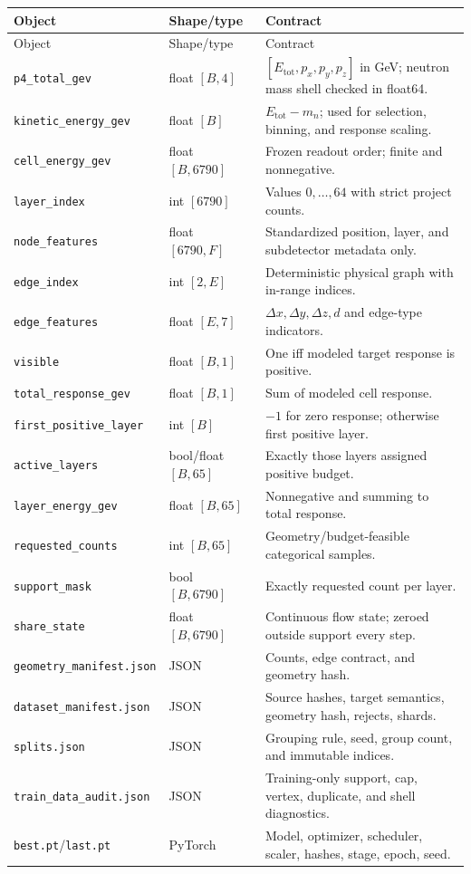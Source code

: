 \documentclass[10pt,a4paper]{article}
\newcommand{\Etot}{E_{\mathrm{tot}}}
\begin{document}
\begin{longtable}{@{}p{}p{}p{}@{}}
\toprule
Object & Shape/type & Contract \\
\midrule
\endfirsthead
\toprule
Object & Shape/type & Contract \\
\midrule
\endhead
\texttt{p4\_total\_gev} & float $[B,4]$ & $[\Etot,p_x,p_y,p_z]$ in GeV; neutron mass shell checked in float64. \\
\texttt{kinetic\_energy\_gev} & float $[B]$ & $\Etot-m_n$; used for selection, binning, and response scaling. \\
\texttt{cell\_energy\_gev} & float $[B,6790]$ & Frozen readout order; finite and nonnegative. \\
\texttt{layer\_index} & int $[6790]$ & Values $0,\ldots,64$ with strict project counts. \\
\texttt{node\_features} & float $[6790,F]$ & Standardized position, layer, and subdetector metadata only. \\
\texttt{edge\_index} & int $[2,E]$ & Deterministic physical graph with in-range indices. \\
\texttt{edge\_features} & float $[E,7]$ & $\Delta x,\Delta y,\Delta z,d$ and edge-type indicators. \\
\texttt{visible} & float $[B,1]$ & One iff modeled target response is positive. \\
\texttt{total\_response\_gev} & float $[B,1]$ & Sum of modeled cell response. \\
\texttt{first\_positive\_layer} & int $[B]$ & $-1$ for zero response; otherwise first positive layer. \\
\texttt{active\_layers} & bool/float $[B,65]$ & Exactly those layers assigned positive budget. \\
\texttt{layer\_energy\_gev} & float $[B,65]$ & Nonnegative and summing to total response. \\
\texttt{requested\_counts} & int $[B,65]$ & Geometry/budget-feasible categorical samples. \\
\texttt{support\_mask} & bool $[B,6790]$ & Exactly requested count per layer. \\
\texttt{share\_state} & float $[B,6790]$ & Continuous flow state; zeroed outside support every step. \\
\texttt{geometry\_manifest.json} & JSON & Counts, edge contract, and geometry hash. \\
\texttt{dataset\_manifest.json} & JSON & Source hashes, target semantics, geometry hash, rejects, shards. \\
\texttt{splits.json} & JSON & Grouping rule, seed, group count, and immutable indices. \\
\texttt{train\_data\_audit.json} & JSON & Training-only support, cap, vertex, duplicate, and shell diagnostics. \\
\texttt{best.pt}/\texttt{last.pt} & PyTorch & Model, optimizer, scheduler, scaler, hashes, stage, epoch, seed. \\
\bottomrule
\end{longtable}
\end{document}
